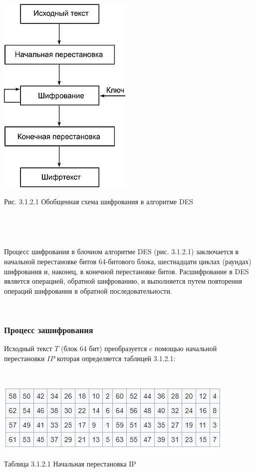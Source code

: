 \documentclass[a4paper]{report}
\begin{document}
\includegraphics[scale=1.4]{DES}
{\centering\caption{\newline Рис. 3.1.2.1 Обобщенная схема шифрования в алгоритме DES}\\}

~

Процесс шифрования в блочном алгоритме DES (рис. 3.1.2.1) заключается в начальной перестановке битов 64-битового блока, шестнадцати циклах (раундах) шифрования и, наконец, в конечной переста­новке битов. Расшифрование в DES является операцией, обратной шифрованию, и выполняется путем повторения операций шифрования в обратной последовательности.

~

\subsubsection{Процесс зашифрования}
Исходный текст $T$ (блок 64 бит) преобразуется c помощью начальной перестановки $IP$ которая определяется таблицей 3.1.2.1:

~

\includegraphics[scale=1.1]{табл}
{\centering\caption{\newline Таблица 3.1.2.1 Начальная перестановка IP}\\}
\end{document}
